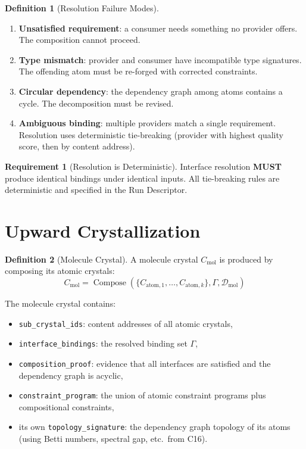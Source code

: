 \documentclass[11pt,a4paper,twoside]{article}
\theoremstyle{definition}
\newtheorem{definition}{Definition}[section]
\newtheorem{requirement}{Requirement}[section]
\theoremstyle{plain}
\theoremstyle{remark}
\newcommand{\calD}{\mathcal{D}}
\DeclareMathOperator{\Compose}{Compose}
\begin{document}
\begin{definition}[Resolution Failure Modes]\label{def:resfail}
\begin{enumerate}[nosep,label=(\roman*)]
  \item \textbf{Unsatisfied requirement}: a consumer needs something
        no provider offers. The composition cannot proceed.
  \item \textbf{Type mismatch}: provider and consumer have incompatible
        type signatures. The offending atom must be re-forged with
        corrected constraints.
  \item \textbf{Circular dependency}: the dependency graph among atoms
        contains a cycle. The decomposition must be revised.
  \item \textbf{Ambiguous binding}: multiple providers match a single
        requirement. Resolution uses deterministic tie-breaking
        (provider with highest quality score, then by content address).
\end{enumerate}
\end{definition}

\begin{requirement}[Resolution is Deterministic]\label{req:resdet}
Interface resolution \textbf{MUST} produce identical bindings under
identical inputs. All tie-breaking rules are deterministic and
specified in the Run Descriptor.
\end{requirement}


\section{Upward Crystallization}\label{sec:upcrystal}

\begin{definition}[Molecule Crystal]\label{def:molcrystal}
A molecule crystal $C_{\mathrm{mol}}$ is produced by composing its
atomic crystals:
\[
  C_{\mathrm{mol}} = \Compose(\{C_{\mathrm{atom},1}, \ldots,
  C_{\mathrm{atom},k}\}, \Gamma, \calD_{\mathrm{mol}})
\]

The molecule crystal contains:
\begin{itemize}[nosep]
  \item \texttt{sub\_crystal\_ids}: content addresses of all atomic
        crystals,
  \item \texttt{interface\_bindings}: the resolved binding set $\Gamma$,
  \item \texttt{composition\_proof}: evidence that all interfaces are
        satisfied and the dependency graph is acyclic,
  \item \texttt{constraint\_program}: the union of atomic constraint
        programs plus compositional constraints,
  \item its own \texttt{topology\_signature}: the dependency graph
        topology of its atoms (using Betti numbers, spectral gap,
        etc.\ from C16).
\end{itemize}
\end{definition}
\end{document}
